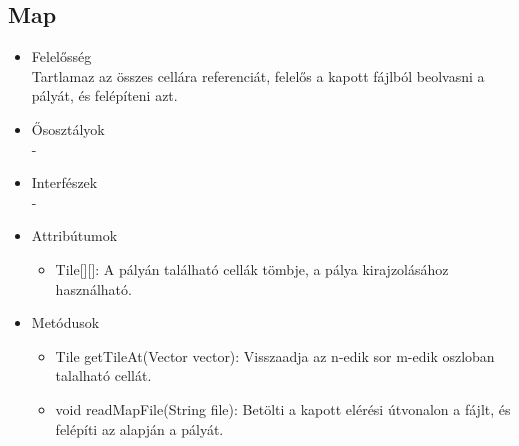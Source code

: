 \subsection{Map}
\begin{itemize}
\item Felelősség\\
Tartlamaz az összes cellára referenciát, felelős a kapott fájlból beolvasni a pályát, és felépíteni azt.
\item Ősosztályok\\
-
\item Interfészek\\
-
\item Attribútumok\\
	\begin{itemize}
		\item Tile[][]: A pályán található cellák tömbje, a pálya kirajzolásához használható.
	\end{itemize}
\item Metódusok\\
	\begin{itemize}
		\item Tile getTileAt(Vector vector): Visszaadja az n-edik sor m-edik oszloban talalható cellát.
		\item void readMapFile(String file): Betölti a kapott elérési útvonalon a fájlt, és felépíti az alapján a pályát.
	\end{itemize}
\end{itemize}


